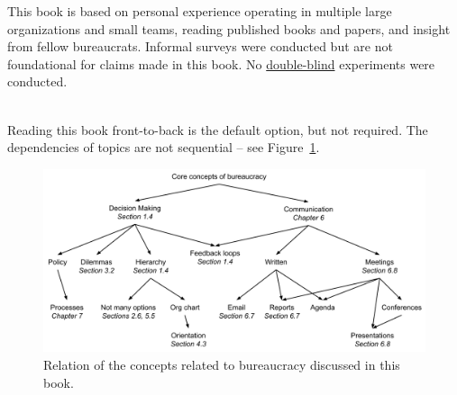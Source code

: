 This book is based on personal experience operating in multiple large organizations and small teams, reading published books and papers, and insight from fellow bureaucrats. Informal surveys were conducted but are not foundational for claims made in this book.%
\iftoggle{WPinmargin}{\marginpar{$>$Wikipedia: blinded-experiment}}{}
No \href{https://en.wikipedia.org/wiki/Blinded_experiment}{double-blind}%
experiments were conducted. 

\ \\

Reading this book front-to-back is the default option, but not required. The dependencies of topics are not sequential -- see Figure~\ref{fig:core-concepts}.

\begin{figure}[ht]
    \centering
    \includegraphics[width=1\textwidth]{images/core_concepts_map.pdf}
    \caption{Relation of the concepts related to bureaucracy discussed in this book.}
    \label{fig:core-concepts}
\end{figure}



